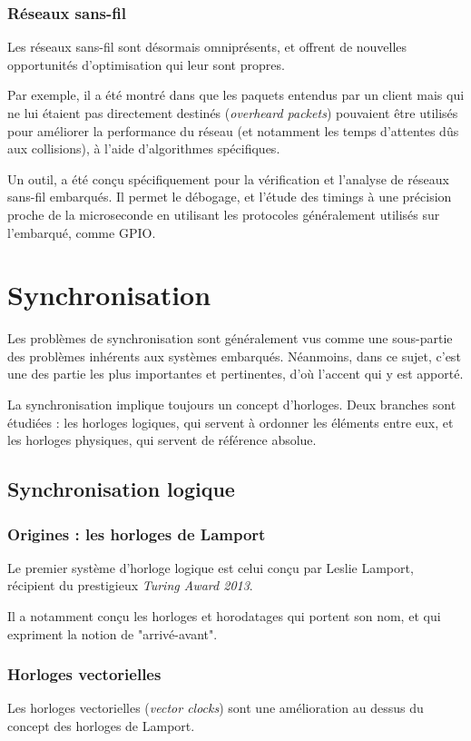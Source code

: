 \subsubsection{Réseaux sans-fil}
Les réseaux sans-fil sont désormais omniprésents, et offrent de nouvelles opportunités d'optimisation qui leur sont propres.

Par exemple, il a été montré dans \cite{hosseinabadi2014exploiting} que les paquets entendus par un client mais qui ne lui étaient pas directement destinés (\textit{overheard packets}) pouvaient être utilisés pour améliorer la performance du réseau (et notamment les temps d'attentes dûs aux collisions), à l'aide d'algorithmes spécifiques.

Un outil,  \cite{lim2013flocklab} a été conçu spécifiquement pour la vérification et l'analyse de réseaux sans-fil embarqués. Il permet le débogage, et l'étude des timings à une précision proche de la microseconde en utilisant les protocoles généralement utilisés sur l'embarqué, comme \ac{GPIO}.  

\section{Synchronisation}
Les problèmes de synchronisation sont généralement vus comme une sous-partie des problèmes inhérents aux systèmes embarqués. Néanmoins, dans ce sujet, c'est une des partie les plus importantes et pertinentes, d'où l'accent qui y est apporté.

La synchronisation implique toujours un concept d'horloges. Deux branches sont étudiées : les horloges logiques, qui servent à ordonner les éléments entre eux, et les horloges physiques, qui servent de référence absolue.

\subsection{Synchronisation logique}
\subsubsection{Origines : les horloges de Lamport}
Le premier système d'horloge logique est celui conçu par Leslie Lamport, récipient du prestigieux \textit{Turing Award 2013}.

Il a notamment conçu les horloges et horodatages qui portent son nom, et qui expriment la notion de "arrivé-avant".
\subsubsection{Horloges vectorielles}
Les horloges vectorielles (\textit{vector clocks}) sont une amélioration au dessus du concept des horloges de Lamport.


